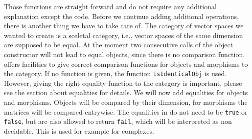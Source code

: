 Those functions are straight forward and do not require any additional explanation except the code. Before we continue
adding additional operations, there is another thing we have to take care of. The category of vector spaces we wanted
to create is a sceletal category, i.e., vector spaces of the same dimension are supposed to be equal. At the moment
two consecutive calls of the object constructor will not lead to equal objects, since there is no comparison function.
\CapPkg offers facilities to give correct comparison functions for objects and morphisms to the category. If no function
is given, the \GAP function \texttt{IsIdenticalObj} is used. However, giving the right equality function to the
category is important, please see the  section about equalities for details. We will now add equalities
for objects and morphisms. Objects will be compared by their dimension, for morphisms the matrices will be compared entrywise.
The equalities in \CapPkg do not need to be \texttt{true} or \texttt{false}, but are also allowed to return \texttt{fail},
which will be interpreted as non decidable. This is used for example for complexes.

